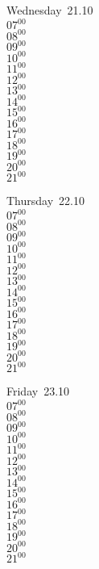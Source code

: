 \documentclass[11pt,a4paper]{book}\usepackage[]{graphicx}\usepackage[]{color}
\begin{document}
\begin{weekdaybox}
  Wednesday~21.10\\
  { 
  \vfill
  $07^{00}$\\
$08^{00}$\\
$09^{00}$\\
$10^{00}$\\
$11^{00}$\\
$12^{00}$\\
$13^{00}$\\
$14^{00}$\\
$15^{00}$\\
$16^{00}$\\
$17^{00}$\\
$18^{00}$\\
$19^{00}$\\
$20^{00}$\\
$21^{00}$\\
  }
\end{weekdaybox}
\clearpage
\begin{headerbox}
\end{headerbox}
\begin{weekdaybox}
  Thursday~22.10\\
  { 
  \vfill
  $07^{00}$\\
$08^{00}$\\
$09^{00}$\\
$10^{00}$\\
$11^{00}$\\
$12^{00}$\\
$13^{00}$\\
$14^{00}$\\
$15^{00}$\\
$16^{00}$\\
$17^{00}$\\
$18^{00}$\\
$19^{00}$\\
$20^{00}$\\
$21^{00}$\\
  }
\end{weekdaybox} 
\begin{weekdaybox}
  Friday~23.10\\
  { 
  \vfill
  $07^{00}$\\
$08^{00}$\\
$09^{00}$\\
$10^{00}$\\
$11^{00}$\\
$12^{00}$\\
$13^{00}$\\
$14^{00}$\\
$15^{00}$\\
$16^{00}$\\
$17^{00}$\\
$18^{00}$\\
$19^{00}$\\
$20^{00}$\\
$21^{00}$\\
  }
\end{weekdaybox}
\end{document}
